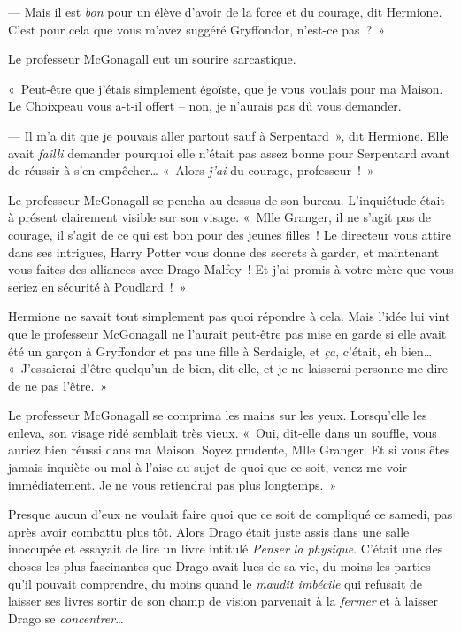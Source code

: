 --- Mais il est \emph{bon} pour un élève d'avoir de la force et du courage, dit Hermione. C'est pour cela que vous m'avez suggéré Gryffondor, n'est-ce pas~?~»

Le professeur McGonagall eut un sourire sarcastique.

«~Peut-être que j'étais simplement égoïste, que je vous voulais pour ma Maison. Le Choixpeau vous a-t-il offert -- non, je n'aurais pas dû vous demander.

--- Il m'a dit que je pouvais aller partout sauf à Serpentard~», dit Hermione. Elle avait \emph{failli} demander pourquoi elle n'était pas assez bonne pour Serpentard avant de réussir à s'en empêcher… «~Alors \emph{j'ai} du courage, professeur~!~»

Le professeur McGonagall se pencha au-dessus de son bureau. L'inquiétude était à présent clairement visible sur son visage. «~Mlle Granger, il ne s'agit pas de courage, il s'agit de ce qui est bon pour des jeunes filles~! Le directeur vous attire dans ses intrigues, Harry Potter vous donne des secrets à garder, et maintenant vous faites des alliances avec Drago Malfoy~! Et j'ai promis à votre mère que vous seriez en sécurité à Poudlard~!~»

Hermione ne savait tout simplement pas quoi répondre à cela. Mais l'idée lui vint que le professeur McGonagall ne l'aurait peut-être pas mise en garde si elle avait été un garçon à Gryffondor et pas une fille à Serdaigle, et \emph{ça}, c'était, eh bien… «~J'essaierai d'être quelqu'un de bien, dit-elle, et je ne laisserai personne me dire de ne pas l'être.~»

Le professeur McGonagall se comprima les mains sur les yeux. Lorsqu'elle les enleva, son visage ridé semblait très vieux. «~Oui, dit-elle dans un souffle, vous auriez bien réussi dans ma Maison. Soyez prudente, Mlle Granger. Et si vous êtes jamais inquiète ou mal à l'aise au sujet de quoi que ce soit, venez me voir immédiatement. Je ne vous retiendrai pas plus longtemps.~»


Presque aucun d'eux ne voulait faire quoi que ce soit de compliqué ce samedi, pas après avoir combattu plus tôt. Alors Drago était juste assis dans une salle inoccupée et essayait de lire un livre intitulé \emph{Penser la physique}. C'était une des choses les plus fascinantes que Drago avait lues de sa vie, du moins les parties qu'il pouvait comprendre, du moins quand le \emph{maudit imbécile} qui refusait de laisser ses livres sortir de son champ de vision parvenait à la \emph{fermer} et à laisser Drago se \emph{concentrer}…

